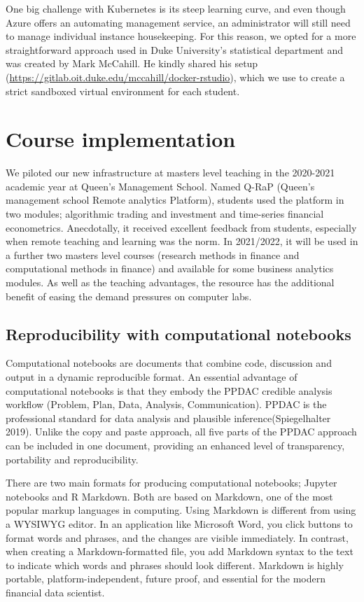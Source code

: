 \documentclass{article}
\begin{document}
One big challenge with Kubernetes is its steep learning curve, and even
though Azure offers an automating management service, an administrator
will still need to manage individual instance housekeeping. For this
reason, we opted for a more straightforward approach used in Duke
University's statistical department and was created by Mark McCahill. He
kindly shared his setup
(\url{https://gitlab.oit.duke.edu/mccahill/docker-rstudio}), which we
use to create a strict sandboxed virtual environment for each student.

\hypertarget{course-implementation}{%
\section{Course implementation}\label{course-implementation}}

We piloted our new infrastructure at masters level teaching in the
2020-2021 academic year at Queen's Management School. Named Q-RaP
(Queen's management school Remote analytics Platform), students used the
platform in two modules; algorithmic trading and investment and
time-series financial econometrics. Anecdotally, it received excellent
feedback from students, especially when remote teaching and learning was
the norm. In 2021/2022, it will be used in a further two masters level
courses (research methods in finance and computational methods in
finance) and available for some business analytics modules. As well as
the teaching advantages, the resource has the additional benefit of
easing the demand pressures on computer labs.

\hypertarget{reproducibility-with-computational-notebooks}{%
\subsection{Reproducibility with computational
notebooks}\label{reproducibility-with-computational-notebooks}}

Computational notebooks are documents that combine code, discussion and
output in a dynamic reproducible format. An essential advantage of
computational notebooks is that they embody the PPDAC credible analysis
workflow (Problem, Plan, Data, Analysis, Communication). PPDAC is the
professional standard for data analysis and plausible
inference(Spiegelhalter 2019). Unlike the copy and paste approach, all
five parts of the PPDAC approach can be included in one document,
providing an enhanced level of transparency, portability and
reproducibility.

There are two main formats for producing computational notebooks;
Jupyter notebooks and R Markdown. Both are based on Markdown, one of the
most popular markup languages in computing. Using Markdown is different
from using a WYSIWYG editor. In an application like Microsoft Word, you
click buttons to format words and phrases, and the changes are visible
immediately. In contrast, when creating a Markdown-formatted file, you
add Markdown syntax to the text to indicate which words and phrases
should look different. Markdown is highly portable,
platform-independent, future proof, and essential for the modern
financial data scientist.
\end{document}
